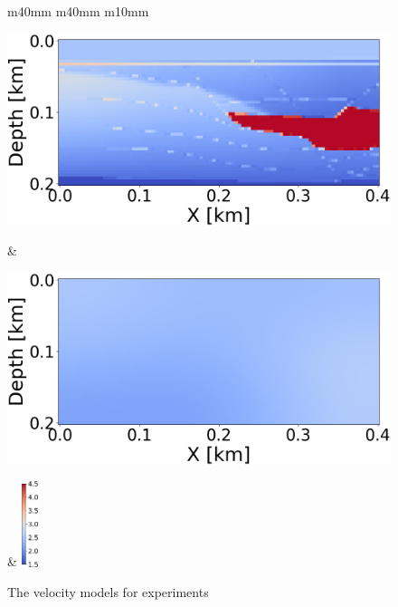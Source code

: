 \begin{figure}[t]
    \centering
    \begin{tabular}{m{40mm} m{40mm} m{10mm}}
        \begin{minipage}[b]{\linewidth}
            \centering
            \includegraphics[width=\linewidth]{public/true}
            \vspace{-9mm}
            \caption*{}
            \vspace{1mm}
        \end{minipage} &
        \hspace{-5mm}
        \begin{minipage}[b]{\linewidth}
            \centering
            \includegraphics[width=\linewidth]{public/initial}
            \vspace{-9mm}
            \caption*{}
            \vspace{1mm}
        \end{minipage} &
        \hspace{-8mm}
        \includegraphics[height=25mm]{public/color-bar}
    \end{tabular}
    \vspace{-3mm}
    \caption{The velocity models for experiments}
    \label{fig:experiment-data}
\end{figure}
